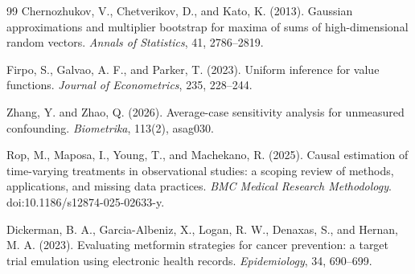 \documentclass{article}
\begin{document}
\begin{thebibliography}{99}
   Chernozhukov, V., Chetverikov, D., and Kato, K. (2013). Gaussian approximations and multiplier bootstrap for maxima of sums of high-dimensional random vectors. \emph{Annals of Statistics}, 41, 2786--2819.

   Firpo, S., Galvao, A. F., and Parker, T. (2023). Uniform inference for value functions. \emph{Journal of Econometrics}, 235, 228--244.

   Zhang, Y. and Zhao, Q. (2026). Average-case sensitivity analysis for unmeasured confounding. \emph{Biometrika}, 113(2), asag030.

   Rop, M., Maposa, I., Young, T., and Machekano, R. (2025). Causal estimation of time-varying treatments in observational studies: a scoping review of methods, applications, and missing data practices. \emph{BMC Medical Research Methodology}. doi:10.1186/s12874-025-02633-y.

   Dickerman, B. A., Garcia-Albeniz, X., Logan, R. W., Denaxas, S., and Hernan, M. A. (2023). Evaluating metformin strategies for cancer prevention: a target trial emulation using electronic health records. \emph{Epidemiology}, 34, 690--699.

\end{thebibliography}
\end{document}
